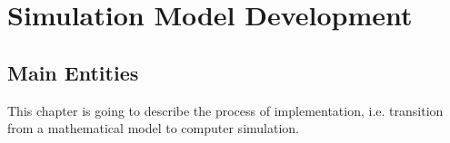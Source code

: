 \chapter{Simulation Model Development}


\section{Main Entities}

This chapter is going to describe the process of implementation, i.e. transition from a mathematical model to computer simulation.
